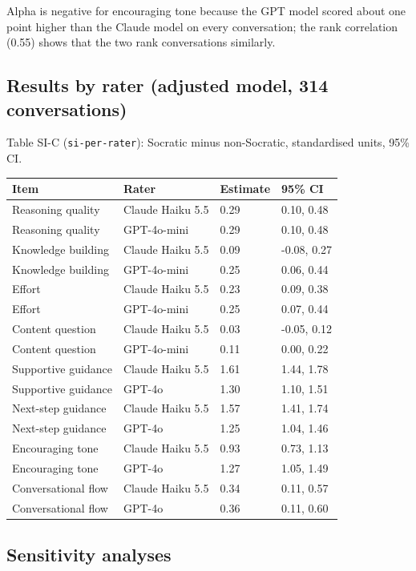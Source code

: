 \documentclass[
  12pt,
]{article}
\begin{document}
Alpha is negative for encouraging tone because the GPT model scored about one point higher than the Claude model on every conversation; the rank correlation (0.55) shows that the two rank conversations similarly.

\subsection{Results by rater (adjusted model, 314 conversations)}\label{results-by-rater-adjusted-model-314-conversations}

Table SI-C (\texttt{si-per-rater}): Socratic minus non-Socratic, standardised units, 95\% CI.

\begin{longtable}[]{@{}llll@{}}
\toprule\noalign{}
Item & Rater & Estimate & 95\% CI \\
\midrule\noalign{}
\endhead
\bottomrule\noalign{}
\endlastfoot
Reasoning quality & Claude Haiku 5.5 & 0.29 & 0.10, 0.48 \\
Reasoning quality & GPT-4o-mini & 0.29 & 0.10, 0.48 \\
Knowledge building & Claude Haiku 5.5 & 0.09 & -0.08, 0.27 \\
Knowledge building & GPT-4o-mini & 0.25 & 0.06, 0.44 \\
Effort & Claude Haiku 5.5 & 0.23 & 0.09, 0.38 \\
Effort & GPT-4o-mini & 0.25 & 0.07, 0.44 \\
Content question & Claude Haiku 5.5 & 0.03 & -0.05, 0.12 \\
Content question & GPT-4o-mini & 0.11 & 0.00, 0.22 \\
Supportive guidance & Claude Haiku 5.5 & 1.61 & 1.44, 1.78 \\
Supportive guidance & GPT-4o & 1.30 & 1.10, 1.51 \\
Next-step guidance & Claude Haiku 5.5 & 1.57 & 1.41, 1.74 \\
Next-step guidance & GPT-4o & 1.25 & 1.04, 1.46 \\
Encouraging tone & Claude Haiku 5.5 & 0.93 & 0.73, 1.13 \\
Encouraging tone & GPT-4o & 1.27 & 1.05, 1.49 \\
Conversational flow & Claude Haiku 5.5 & 0.34 & 0.11, 0.57 \\
Conversational flow & GPT-4o & 0.36 & 0.11, 0.60 \\
\end{longtable}

\subsection{Sensitivity analyses}\label{sensitivity-analyses}
\end{document}
